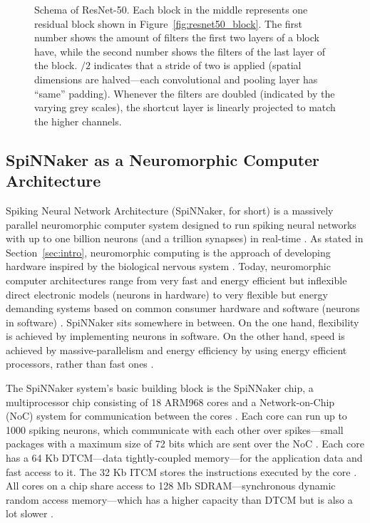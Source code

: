 \documentclass[]{article}
\begin{document}
\begin{figure}
\begin{center}
  \end{center}
  \caption{Schema of ResNet-50. Each block in the middle represents
    one residual block shown in Figure~\ref{fig:resnet50_block}.
    The first number shows the amount of filters the first two layers
    of a block have, while the second number shows the filters of the
    last layer of the block. $/2$ indicates that a stride of two is
    applied (spatial dimensions are halved---each convolutional and
    pooling layer has ``same'' padding). Whenever the filters are
    doubled (indicated by the varying grey scales), the shortcut layer
    is linearly projected to match the higher channels.}
  \label{fig:resnet50}
\end{figure}



\subsection{SpiNNaker as a Neuromorphic Computer Architecture} %
\label{subsec:intro_spinn}

Spiking Neural Network Architecture (SpiNNaker, for short) is a
massively parallel neuromorphic computer system designed to run
spiking neural networks with up to one billion neurons (and a trillion
synapses) in real-time \citep{painkras_et_al_2013}.
As stated in Section~\ref{sec:intro}, neuromorphic computing is
the approach of developing hardware inspired by the biological
nervous system \citep{mead_1989}.
Today, neuromorphic computer architectures range from very fast and
energy efficient but inflexible direct electronic models
(neurons in hardware) \citep{indiveri_et_al_2011} to very flexible but
energy demanding systems based on common consumer hardware and
software (neurons in software) \citep{plesser_et_al_2007}.
SpiNNaker sits somewhere in between.
On the one hand, flexibility is achieved by implementing neurons in
software.
On the other hand, speed is achieved by massive-parallelism and
energy efficiency by using energy efficient processors, rather than
fast ones \citep{furber_et_al_2020}.

The SpiNNaker system's basic building block is the SpiNNaker chip,
a multiprocessor chip consisting of 18 ARM968 cores and a
Network-on-Chip (NoC) system for communication between the cores
\citep{furber_et_al_2007, furber_et_al_2020}.
Each core can run up to 1000 spiking neurons, which communicate with
each other over spikes---small packages with a maximum size of 72 bits
which are sent over the NoC \citep{furber_et_al_2007, spinnaker_2020}.
Each core has a 64 Kb DTCM---data tightly-coupled memory---for the
application data and fast access to it.
The 32 Kb ITCM stores the instructions executed by the core
\citep{furber_et_al_2020}.
All cores on a chip share access to 128 Mb SDRAM---synchronous
dynamic random access memory---which has a higher capacity than
DTCM but is also a lot slower
\citep{furber_et_al_2020, spinnaker_2020a}.
\end{document}
